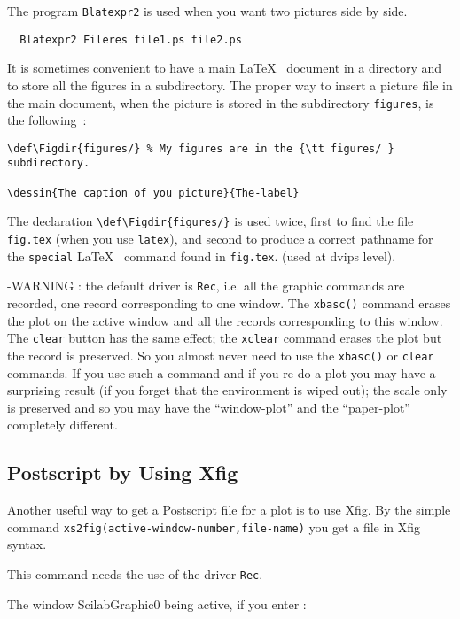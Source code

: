 The program \verb+Blatexpr2+ is used when you want two pictures side
by side.
\begin{verbatim}
  Blatexpr2 Fileres file1.ps file2.ps 
\end{verbatim}



It is sometimes convenient to have a main \LaTeX~ document in a directory
and to store all the figures in a subdirectory. The proper way to
insert a  picture file in the main document, when the picture 
is stored in the subdirectory \verb+figures+, is the following~:

\begin{verbatim}
\def\Figdir{figures/} % My figures are in the {\tt figures/ } subdirectory.

\dessin{The caption of you picture}{The-label}
\end{verbatim}

The declaration \verb+\def\Figdir{figures/}+ is used twice, first to
find the file {\tt fig.tex} (when you use \verb+latex+), and
 second to produce a correct pathname for the
\verb+special+ \LaTeX~ command  found in \verb+fig.tex+. (used at
dvips level).

-WARNING : the default driver is {\tt Rec}, i.e. all the graphic commands are
recorded, one record corresponding to one window. The {\tt xbasc()} command
erases the plot on the active window and all the records corresponding to
this window. The {\tt  clear} button has the same effect; the {\tt xclear}
command erases the plot but the record is preserved. So you almost never need
to use the {\tt xbasc()} or {\tt  clear} commands. If you use such a command 
and if you re-do a plot you may have a surprising result (if you forget
that the environment is wiped out); the scale only is preserved and so you 
may have the ``window-plot'' and the ``paper-plot'' completely different.


\subsection{Postscript by Using Xfig}

Another useful way to get a Postscript file for a plot is to use Xfig.
By the simple command {\tt xs2fig(active-window-number,file-name)} you get
a file in Xfig syntax. 

This command needs the use of the driver {\tt Rec}.

The window ScilabGraphic0 being  active, if you enter :

